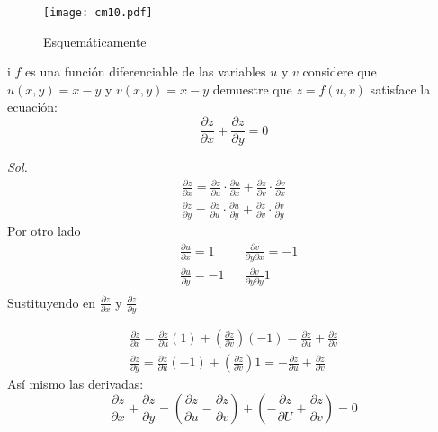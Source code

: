 \begin{figure}[h!]
	\texttt{[image: cm10.pdf]}
	\caption{Esquemáticamente}
	\label{cm10}
\end{figure}

\begin{example}
	i $f$ es una función diferenciable de las variables $u$ y $v$
	considere que $u(x,y)=x-y$ y $v(x,y)=x-y$ demuestre que
	$z=f(u,v)$ satisface la ecuación:
	\begin{equation*}
		\frac{\partial z}{\partial x}+\frac{\partial z}{\partial y}=0
	\end{equation*}
\end{example}

\textit{ Sol. }
\begin{align*}
	\frac{\partial z}{\partial x}=\frac{\partial z}{\partial u}\cdot \frac{\partial u}{\partial x}+\frac{\partial z}{\partial v}\cdot \frac{\partial v}{\partial x} \\
	\frac{\partial z}{\partial y}=\frac{\partial z}{\partial u}\cdot \frac{\partial u}{\partial y}+\frac{\partial z}{\partial v}\cdot \frac{\partial v}{\partial y}
\end{align*}
Por otro lado
\begin{align*}
	 & \frac{\partial u}{\partial x}=1  &  & \frac{\partial v}{\partial y\partial x}=-1 \\
	 & \frac{\partial u}{\partial y}=-1 &  & \frac{\partial v}{\partial y\partial y}1   \\
\end{align*}
Sustituyendo en $\frac{\partial z}{\partial x}$ y $\frac{\partial z}{\partial y}$

\begin{align*}
	\frac{\partial z}{\partial x}=\frac{\partial z}{\partial u}(1)+\left(\frac{\partial z}{\partial v}\right)(-1)=\frac{\partial z}{\partial u}+\frac{\partial z}{\partial v} \\
	\frac{\partial z}{\partial y}=\frac{\partial z}{\partial u}(-1)+\left(\frac{\partial z}{\partial v}\right)1=-\frac{\partial z}{\partial u}+\frac{\partial z}{\partial v}
\end{align*}
Así mismo las derivadas:
\begin{equation*}
	\frac{\partial z}{\partial x}+\frac{\partial z}{\partial y}=\left(\frac{\partial z}{\partial u}-\frac{\partial z}{\partial v}\right)+\left(-\frac{\partial z}{\partial U}+\frac{\partial z}{\partial v}\right)=0
\end{equation*}

%

